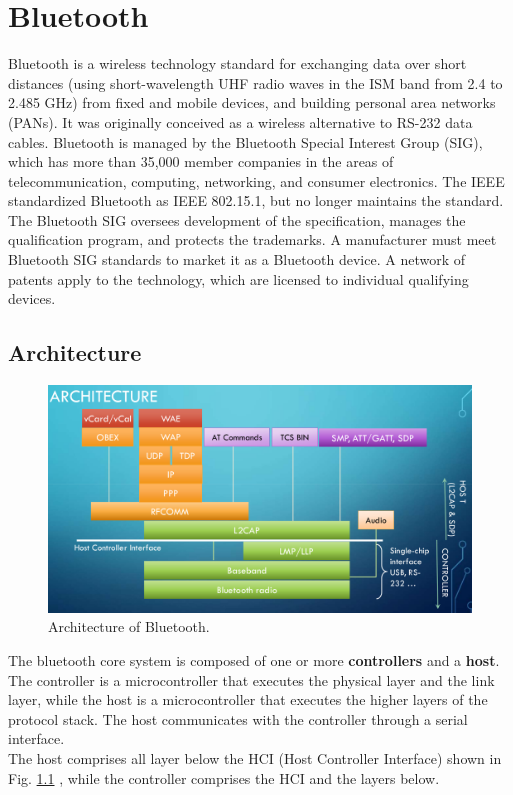 \chapter{Bluetooth}

Bluetooth is a wireless technology standard for exchanging data over short distances (using short-wavelength UHF radio waves in the ISM band from 2.4 to 2.485 GHz) from fixed and mobile devices, and building personal area networks (PANs). It was originally conceived as a wireless alternative to RS-232 data cables. Bluetooth is managed by the Bluetooth Special Interest Group (SIG), which has more than 35,000 member companies in the areas of telecommunication, computing, networking, and consumer electronics. The IEEE standardized Bluetooth as IEEE 802.15.1, but no longer maintains the standard. The Bluetooth SIG oversees development of the specification, manages the qualification program, and protects the trademarks. A manufacturer must meet Bluetooth SIG standards to market it as a Bluetooth device. A network of patents apply to the technology, which are licensed to individual qualifying devices.

\section{Architecture}
\begin{figure}[htbp]
   \centering
   \includegraphics{images/bluetooth_architecture.png}
   \caption{Architecture of Bluetooth.}
   \label{fig:bluetooth_architecture}
\end{figure}

The bluetooth core system is composed of one or more \textbf{controllers} and a \textbf{host}. The controller is a microcontroller that executes the physical layer and the link layer, while the host is a microcontroller that executes the higher layers of the protocol stack. The host communicates with the controller through a serial interface.\\
The host comprises all layer below the HCI (Host Controller Interface) shown in Fig. \ref{fig:bluetooth_architecture} , while the controller comprises the HCI and the layers below.


